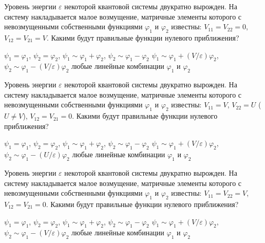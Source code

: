 \documentclass[11pt,a4paper]{exam}
\begin{document}
\begin{questions}
\question Уровень энергии $\varepsilon $ некоторой квантовой системы двукратно вырожден. На систему накладывается малое возмущение, матричные элементы которого с невозмущенными собственными функциями ${\varphi _1}$ и ${\varphi _2}$ известны: ${V_{11}} = {V_{22}} = 0$, ${V_{12}} = {V_{21}} = V$. Какими будут правильные функции нулевого приближения?
\begin{choices}
\choice ${\psi _1} = {\varphi _1}$, ${\psi _2} = {\varphi _2}$,           
\choice ${\psi _1} \sim {\varphi _1} + {\varphi _2}$, ${\psi _2} \sim {\varphi _1} - {\varphi _2}$
\choice ${\psi _1} \sim {\varphi _1} + \left( {V/\varepsilon } \right){\varphi _2}$, ${\psi _2} \sim {\varphi _1} - \left( {V/\varepsilon } \right){\varphi _2}$ 
\choice любые линейные комбинации ${\varphi _1}$ и ${\varphi _2}$
\end{choices}

\question Уровень энергии $\varepsilon $ некоторой квантовой системы двукратно вырожден. На систему накладывается малое возмущение, матричные элементы которого с невозмущенными собственными функциями ${\varphi _1}$ и ${\varphi _2}$ известны: ${V_{11}} = V$, ${V_{22}} = U$ ($U \ne V$), ${V_{12}} = {V_{21}} = 0$. Какими будут правильные функции нулевого приближения?
\begin{choices}
\choice ${\psi _1} = {\varphi _1}$, ${\psi _2} = {\varphi _2}$,           
\choice ${\psi _1} \sim {\varphi _1} + {\varphi _2}$, ${\psi _2} \sim {\varphi _1} - {\varphi _2}$
\choice ${\psi _1} \sim {\varphi _1} + \left( {V/\varepsilon } \right){\varphi _2}$, ${\psi _2} \sim {\varphi _1} - \left( {U/\varepsilon } \right){\varphi _2}$ 
\choice любые линейные комбинации ${\varphi _1}$ и ${\varphi _2}$
\end{choices}

\question Уровень энергии $\varepsilon $ некоторой квантовой системы двукратно вырожден. На систему накладывается малое возмущение, матричные элементы которого с невозмущенными собственными функциями ${\varphi _1}$ и ${\varphi _2}$ известны: ${V_{11}} = {V_{22}} = V$, ${V_{12}} = {V_{21}} = 0$. Какими будут правильные функции нулевого приближения?
\begin{choices}
\choice ${\psi _1} = {\varphi _1}$, ${\psi _2} = {\varphi _2}$,           
\choice ${\psi _1} \sim {\varphi _1} + {\varphi _2}$, ${\psi _2} \sim {\varphi _1} - {\varphi _2}$
\choice ${\psi _1} \sim {\varphi _1} + \left( {V/\varepsilon } \right){\varphi _2}$, ${\psi _2} \sim {\varphi _1} - \left( {V/\varepsilon } \right){\varphi _2}$ 
\choice любые линейные комбинации ${\varphi _1}$ и ${\varphi _2}$
\end{choices}


\end{questions}
\end{document}
